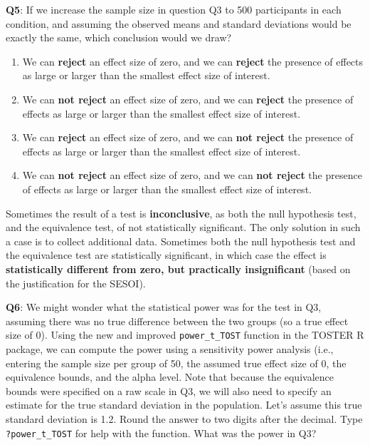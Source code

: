 \documentclass[
  oneside]{book}
\providecommand{\tightlist}{%
  \setlength{\itemsep}{0pt}\setlength{\parskip}{0pt}}
\begin{document}
\textbf{Q5}: If we increase the sample size in question Q3 to 500 participants in each condition, and assuming the observed means and standard deviations would be exactly the same, which conclusion would we draw?

\begin{enumerate}
\def\labelenumi{\Alph{enumi})}
\tightlist
\item
  We can \textbf{reject} an effect size of zero, and we can \textbf{reject} the presence of effects as large or larger than the smallest effect size of interest.
\item
  We can \textbf{not reject} an effect size of zero, and we can \textbf{reject} the presence of effects as large or larger than the smallest effect size of interest.
\item
  We can \textbf{reject} an effect size of zero, and we can \textbf{not reject} the presence of effects as large or larger than the smallest effect size of interest.
\item
  We can \textbf{not reject} an effect size of zero, and we can \textbf{not reject} the presence of effects as large or larger than the smallest effect size of interest.
\end{enumerate}

Sometimes the result of a test is \textbf{inconclusive}, as both the null hypothesis test, and the equivalence test, of not statistically significant. The only solution in such a case is to collect additional data. Sometimes both the null hypothesis test and the equivalence test are statistically significant, in which case the effect is \textbf{statistically different from zero, but practically insignificant} (based on the justification for the SESOI).

\textbf{Q6}: We might wonder what the statistical power was for the test in Q3, assuming there was no true difference between the two groups (so a true effect size of 0). Using the new and improved \texttt{power\_t\_TOST} function in the TOSTER R package, we can compute the power using a sensitivity power analysis (i.e., entering the sample size per group of 50, the assumed true effect size of 0, the equivalence bounds, and the alpha level. Note that because the equivalence bounds were specified on a raw scale in Q3, we will also need to specify an estimate for the true standard deviation in the population. Let's assume this true standard deviation is 1.2. Round the answer to two digits after the decimal. Type \texttt{?power\_t\_TOST} for help with the function. What was the power in Q3?
\end{document}
